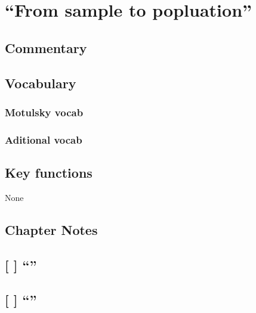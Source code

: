\documentclass[]{book}
\theoremstyle{definition}
\theoremstyle{definition}
\theoremstyle{definition}
\theoremstyle{remark}
\begin{document}
\chapter{\texorpdfstring{``From sample to
popluation''}{From sample to popluation}}\label{ch3}

\section*{Commentary}\label{commentary-2}

\section*{Vocabulary}\label{vocabulary-2}

\subsection*{Motulsky vocab}\label{motulsky-vocab-2}

\subsection*{Aditional vocab}\label{aditional-vocab-1}

\section*{Key functions}\label{key-functions-2}

None

\section*{Chapter Notes}\label{chapter-notes-2}

\section{\texorpdfstring{{[} {]} ``''}{{[} {]} }}\label{section}

\section{\texorpdfstring{{[} {]} ``''}{{[} {]} }}\label{section-1}
\end{document}
